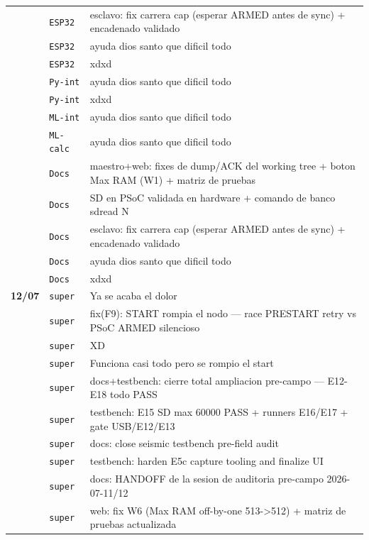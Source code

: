 \begin{longtable}{@{}p{1.7cm} p{1.5cm} p{12.2cm}@{}}
 & \texttt{\scriptsize ESP32} & esclavo: fix carrera cap (esperar ARMED antes de sync) + encadenado validado \\
 & \texttt{\scriptsize ESP32} & ayuda dios santo que dificil todo \\
 & \texttt{\scriptsize ESP32} & xdxd \\
 & \texttt{\scriptsize Py-int} & ayuda dios santo que dificil todo \\
 & \texttt{\scriptsize Py-int} & xdxd \\
 & \texttt{\scriptsize ML-int} & ayuda dios santo que dificil todo \\
 & \texttt{\scriptsize ML-calc} & ayuda dios santo que dificil todo \\
 & \texttt{\scriptsize Docs} & maestro+web: fixes de dump/ACK del working tree + boton Max RAM (W1) + matriz de pruebas \\
 & \texttt{\scriptsize Docs} & SD en PSoC validada en hardware + comando de banco sdread N \\
 & \texttt{\scriptsize Docs} & esclavo: fix carrera cap (esperar ARMED antes de sync) + encadenado validado \\
 & \texttt{\scriptsize Docs} & ayuda dios santo que dificil todo \\
 & \texttt{\scriptsize Docs} & xdxd \\
\textbf{12/07} & \texttt{\scriptsize super} & Ya se acaba el dolor \\
 & \texttt{\scriptsize super} & fix(F9): START rompia el nodo --- race PRESTART retry vs PSoC ARMED silencioso \\
 & \texttt{\scriptsize super} & XD \\
 & \texttt{\scriptsize super} & Funciona casi todo pero se rompio el start \\
 & \texttt{\scriptsize super} & docs+testbench: cierre total ampliacion pre-campo --- E12-E18 todo PASS \\
 & \texttt{\scriptsize super} & testbench: E15 SD max 60000 PASS + runners E16/E17 + gate USB/E12/E13 \\
 & \texttt{\scriptsize super} & docs: close seismic testbench pre-field audit \\
 & \texttt{\scriptsize super} & testbench: harden E5c capture tooling and finalize UI \\
 & \texttt{\scriptsize super} & docs: HANDOFF de la sesion de auditoria pre-campo 2026-07-11/12 \\
 & \texttt{\scriptsize super} & web: fix W6 (Max RAM off-by-one 513->512) + matriz de pruebas actualizada \\

\end{longtable}
